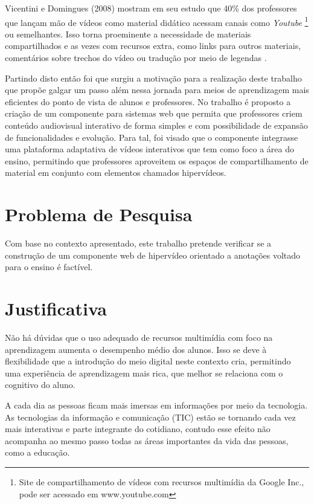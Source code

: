 Vicentini e Domingues (2008) mostram em seu estudo que 40\% dos professores que lançam mão de vídeos como material didático acessam canais como \textit{Youtube} \footnote{Site de compartilhamento de vídeos com recursos multimídia da Google Inc., pode ser acessado em www.youtube.com} ou semelhantes. Isso torna proeminente a necessidade de materiais compartilhados e as vezes com recursos extra, como links para outros materiais, comentários sobre trechos do vídeo ou tradução por meio de legendas \cite{vicentini2008uso}.

Partindo disto então foi que surgiu a motivação para a realização deste trabalho que propõe galgar um passo além nessa jornada para meios de aprendizagem mais eficientes do ponto de vista de alunos e professores. No trabalho é proposto a criação de um componente para sistemas web que permita que professores criem conteúdo audiovisual interativo de forma simples e com possibilidade de expansão de funcionalidades e evolução. Para tal, foi visado que o componente integrasse uma plataforma adaptativa de vídeos interativos que tem como foco a área do ensino, permitindo que professores aproveitem os espaços de compartilhamento de material em conjunto com elementos chamados hipervídeos.

\section{Problema de Pesquisa}

Com base no contexto apresentado, este trabalho pretende verificar se a construção de um componente web de hipervídeo orientado a anotações voltado para o ensino é factível.

\section{Justificativa}

Não há dúvidas que o uso adequado de recursos multimídia com foco na aprendizagem aumenta o desempenho médio dos alunos. Isso se deve à flexibilidade que a introdução do meio digital neste contexto cria, permitindo uma experiência de aprendizagem mais rica, que melhor se relaciona com o cognitivo do aluno.

A cada dia as pessoas ficam mais imersas em informações por meio da tecnologia. As tecnologias da informação e comunicação (TIC) estão se tornando cada vez mais interativas e parte integrante do cotidiano, contudo esse efeito não acompanha ao mesmo passo todas as áreas importantes da vida das pessoas, como a educação.

